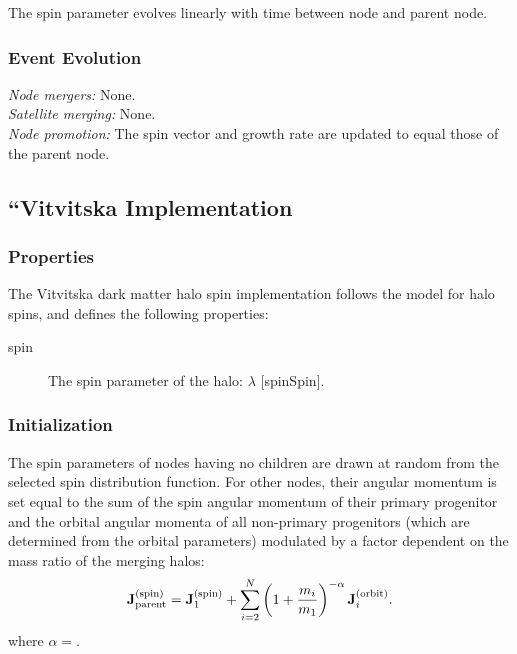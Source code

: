 The spin parameter evolves linearly with time between \gls{node} and parent node.

\subsubsection{Event Evolution}

\noindent\emph{Node mergers:} None.\\

\noindent\emph{Satellite merging:} None.\\

\noindent\emph{Node promotion:} The spin vector and growth rate are updated to equal those of the parent node.\\

\subsection{``Vitvitska Implementation}

\subsubsection{Properties}

The Vitvitska dark matter halo spin implementation follows the \cite{vitvitska_origin_2002} model for halo spins, and defines the following properties:
\begin{description}
 \item [{\normalfont \ttfamily spin}] The spin parameter of the halo: $\lambda$ [{\normalfont \ttfamily spinSpin}].
\end{description}

\subsubsection{Initialization}

The spin parameters of nodes having no children are drawn at random from the selected spin distribution function. For other nodes, their angular momentum is set equal to the sum of the spin angular momentum of their primary progenitor and the orbital angular momenta of all non-primary progenitors (which are determined from the orbital parameters) modulated by a factor dependent on the mass ratio of the merging halos:
\begin{equation}
 \mathbf{J}^\mathrm{(spin)}_\mathrm{parent} = \mathbf{J}^\mathrm{(spin)}_{1} + \sum_{i=2}^N \left(1+{m_i \over m_{1}}\right)^{-\alpha} \mathbf{J}^\mathrm{(orbit)}_{i}.
\end{equation}
where $\alpha=${\normalfont \ttfamily [spinVitvitskaMergerRatioExponent]}. 

